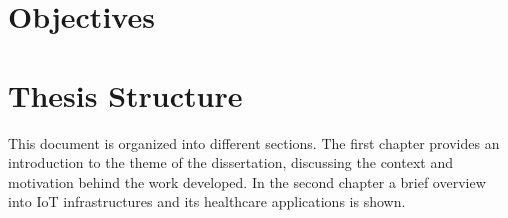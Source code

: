 \section{Objectives}
\section{Thesis Structure}

This document is organized into different sections. The first chapter provides an introduction to the theme of the dissertation, discussing the context and motivation behind the work developed. In the second chapter a brief overview into \acs{IoT} infrastructures and its healthcare applications is shown. 

